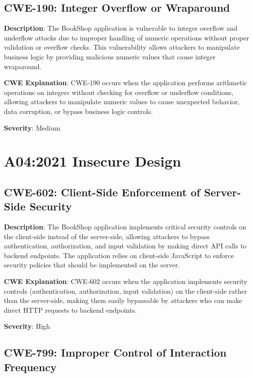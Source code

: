 \documentclass[]{UCD_CS_FYP_Report}
\begin{document}
\section{CWE-190: Integer Overflow or Wraparound}

\textbf{Description}: The BookShop application is vulnerable to integer overflow and underflow attacks due to improper handling of numeric operations without proper validation or overflow checks. This vulnerability allows attackers to manipulate business logic by providing malicious numeric values that cause integer wraparound.

\textbf{CWE Explanation}: CWE-190 occurs when the application performs arithmetic operations on integers without checking for overflow or underflow conditions, allowing attackers to manipulate numeric values to cause unexpected behavior, data corruption, or bypass business logic controls.

\textbf{Severity}: Medium



\chapter{A04:2021 Insecure Design}

\section{CWE-602: Client-Side Enforcement of Server-Side Security}

\textbf{Description}: The BookShop application implements critical security controls on the client-side instead of the server-side, allowing attackers to bypass authentication, authorization, and input validation by making direct API calls to backend endpoints. The application relies on client-side JavaScript to enforce security policies that should be implemented on the server.

\textbf{CWE Explanation}: CWE-602 occurs when the application implements security controls (authentication, authorization, input validation) on the client-side rather than the server-side, making them easily bypassable by attackers who can make direct HTTP requests to backend endpoints.

\textbf{Severity}: High



\section{CWE-799: Improper Control of Interaction Frequency}
\end{document}
